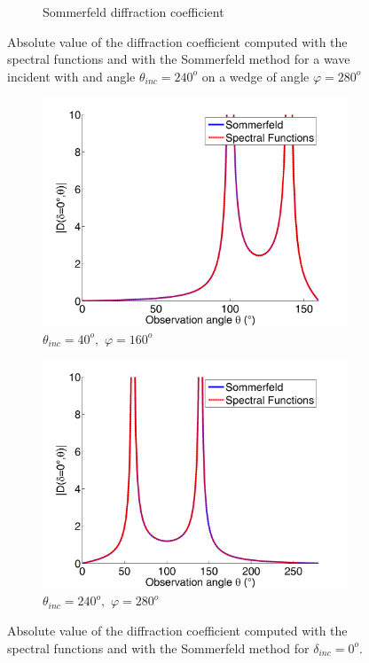 \begin{figure}
\begin{subfigure}[b]{0.49\textwidth}
        \caption{Sommerfeld diffraction coefficient}
        \label{C4:Som280240}
    \end{subfigure}
\caption{Absolute value of the diffraction coefficient computed with the spectral functions and with the Sommerfeld method for a wave incident with and angle $\theta_{inc}=240^o$ on a wedge of angle $\varphi=280^o$}
\label{C4:ac280240}
\end{figure}

\begin{figure}
\centering
\begin{subfigure}[b]{0.49\textwidth}
        \includegraphics[width=\textwidth]{images/chapter4/D_160_40_0.png}
        \caption{$\theta_{inc}=40^o, \, \, \varphi=160^o$}
        \label{C4:ac280240}
    \end{subfigure}
\begin{subfigure}[b]{0.49\textwidth}
        \includegraphics[width=\textwidth]{images/chapter4/D_280_239_0.png}
        \caption{$\theta_{inc}=240^o, \, \, \varphi=280^o$}
        \label{C4:Som280240}
    \end{subfigure}
\caption{Absolute value of the diffraction coefficient computed with the spectral functions and with the Sommerfeld method for $\delta_{inc}=0^o$.}
\label{C4:ac280240}
\end{figure}

